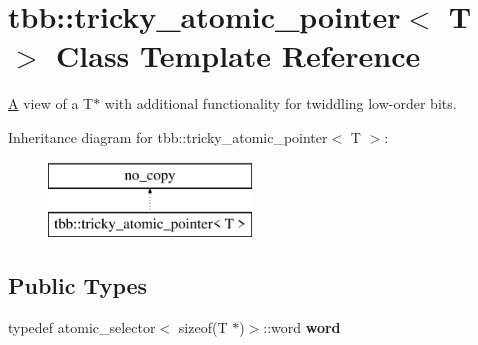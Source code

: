 \hypertarget{classtbb_1_1tricky__atomic__pointer}{}\section{tbb\+:\+:tricky\+\_\+atomic\+\_\+pointer$<$ T $>$ Class Template Reference}
\label{classtbb_1_1tricky__atomic__pointer}


\hyperlink{structA}{A} view of a T$\ast$ with additional functionality for twiddling low-\/order bits.  


Inheritance diagram for tbb\+:\+:tricky\+\_\+atomic\+\_\+pointer$<$ T $>$\+:\begin{figure}[H]
\begin{center}
\leavevmode
\includegraphics[height=2.000000cm]{classtbb_1_1tricky__atomic__pointer}
\end{center}
\end{figure}
\subsection*{Public Types}
\begin{DoxyCompactItemize}
\item 
\hypertarget{classtbb_1_1tricky__atomic__pointer_a895d00be1f535b43102d037b4e0197d6}{}typedef atomic\+\_\+selector$<$ sizeof(T $\ast$)$>$\+::word {\bfseries word}\label{classtbb_1_1tricky__atomic__pointer_a895d00be1f535b43102d037b4e0197d6}

\end{DoxyCompactItemize}

